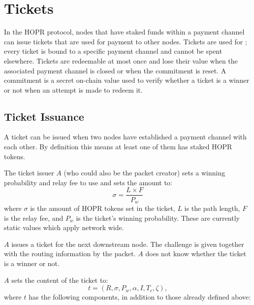 \section{Tickets}
\label{sec:tickets}

In the HOPR protocol, nodes that have staked funds within a payment channel can issue tickets that are used for payment to other nodes. Tickets are used for ; every ticket is bound to a specific payment channel and cannot be spent elsewhere. Tickets are redeemable at most once and lose their value when the associated payment channel is closed or when the commitment is reset. A commitment is a secret on-chain value used to verify whether a ticket is a winner or not when an attempt is made to redeem it.

\subsection{Ticket Issuance}

A ticket can be issued when two nodes have established a payment channel with each other. By definition this means at least one of them has staked HOPR tokens.

The ticket issuer $A$ (who could also be the packet creator) sets a winning probability and relay fee to use and sets the amount to: $$\sigma=\dfrac{L\times F}{P_w}$$ where $\sigma$ is the amount of HOPR tokens set in the ticket, $L$ is the path length, $F$ is the relay fee, and $P_w$ is the ticket's winning probability. These are currently static values which apply network wide. 

$A$ issues a ticket for the next downstream node. The challenge is given together with the routing information by the packet. $A$ does not know whether the ticket is a winner or not.

$A$ sets the content of the ticket to: $$t=(R,\sigma,P_w,\alpha,I,T_c,\zeta),$$ where $t$ has the following components, in addition to those already defined above:

